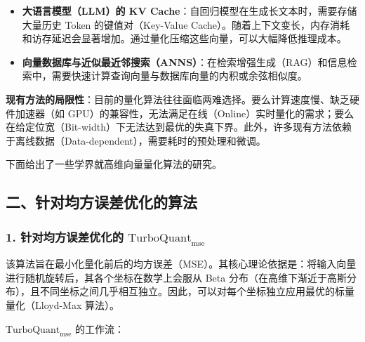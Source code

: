 \begin{itemize}
\tightlist
\item
  \textbf{大语言模型（LLM）的 KV Cache}：自回归模型在生成长文本时，需要存储大量历史 Token 的键值对（Key-Value Cache）。随着上下文变长，内存消耗和访存延迟会显著增加。通过量化压缩这些向量，可以大幅降低推理成本。
\item
  \textbf{向量数据库与近似最近邻搜索（ANNS）}：在检索增强生成（RAG）和信息检索中，需要快速计算查询向量与数据库向量的内积或余弦相似度。
\end{itemize}

\textbf{现有方法的局限性}：目前的量化算法往往面临两难选择。要么计算速度慢、缺乏硬件加速器（如 GPU）的兼容性，无法满足在线（Online）实时量化的需求；要么在给定位宽（Bit-width）下无法达到最优的失真下界。此外，许多现有方法依赖于离线数据（Data-dependent），需要耗时的预处理和微调。

下面给出了一些学界就高维向量量化算法的研究。

\hypertarget{ux4e8cux9488ux5bf9ux5747ux65b9ux8befux5deeux4f18ux5316ux7684ux7b97ux6cd5}{%
\subsection{二、针对均方误差优化的算法}\label{ux4e8cux9488ux5bf9ux5747ux65b9ux8befux5deeux4f18ux5316ux7684ux7b97ux6cd5}}

\hypertarget{ux9488ux5bf9ux5747ux65b9ux8befux5deeux4f18ux5316ux7684-mathrmturboquant_mathrmmse}{%
\subsubsection{\texorpdfstring{1. 针对均方误差优化的 \(\mathrm{TurboQuant}_{\mathrm{mse}}\)}{1. 针对均方误差优化的 \textbackslash mathrm\{TurboQuant\}\_\{\textbackslash mathrm\{mse\}\}}}\label{ux9488ux5bf9ux5747ux65b9ux8befux5deeux4f18ux5316ux7684-mathrmturboquant_mathrmmse}}

该算法旨在最小化量化前后的均方误差（MSE）。其核心理论依据是：将输入向量进行随机旋转后，其各个坐标在数学上会服从 Beta 分布（在高维下渐近于高斯分布），且不同坐标之间几乎相互独立。因此，可以对每个坐标独立应用最优的标量量化（Lloyd-Max 算法）。

\(\mathrm{TurboQuant}_{\mathrm{mse}}\) 的工作流：

